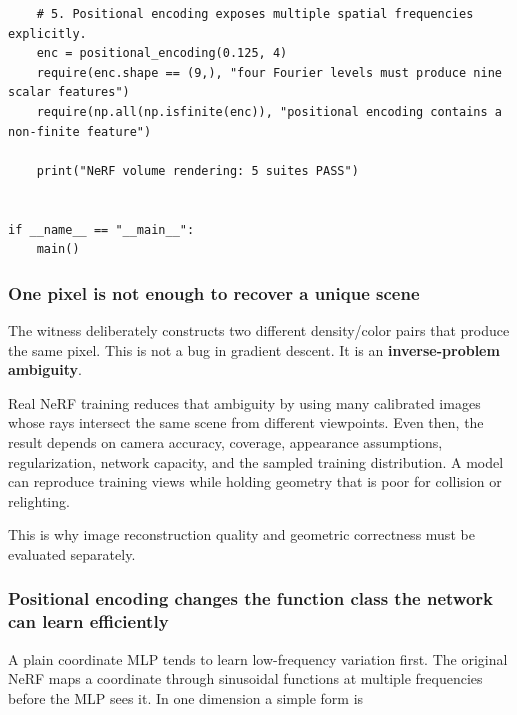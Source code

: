 \begin{verbatim}
    # 5. Positional encoding exposes multiple spatial frequencies explicitly.
    enc = positional_encoding(0.125, 4)
    require(enc.shape == (9,), "four Fourier levels must produce nine scalar features")
    require(np.all(np.isfinite(enc)), "positional encoding contains a non-finite feature")

    print("NeRF volume rendering: 5 suites PASS")


if __name__ == "__main__":
    main()
\end{verbatim}

\subsubsection{One pixel is not enough to recover a unique scene}\label{04-visual-computing-ii-ch035-one-pixel-is-not-enough-to-recover-a-unique-scene}

\hypertarget{04-visual-computing-ii-ch035-one-pixel-is-not-enough-to-recover-a-unique-scene}{}

The witness deliberately constructs two different density/color pairs that produce the same pixel. This is not a bug in gradient descent. It is an \textbf{inverse-problem ambiguity}.

Real NeRF training reduces that ambiguity by using many calibrated images whose rays intersect the same scene from different viewpoints. Even then, the result depends on camera accuracy, coverage, appearance assumptions, regularization, network capacity, and the sampled training distribution. A model can reproduce training views while holding geometry that is poor for collision or relighting.

This is why image reconstruction quality and geometric correctness must be evaluated separately.

\subsubsection{Positional encoding changes the function class the network can learn efficiently}\label{04-visual-computing-ii-ch035-positional-encoding-changes-the-function-class-the-network-can-learn-efficiently}

\hypertarget{04-visual-computing-ii-ch035-positional-encoding-changes-the-function-class-the-network-can-learn-efficiently}{}

A plain coordinate MLP tends to learn low-frequency variation first. The original NeRF maps a coordinate through sinusoidal functions at multiple frequencies before the MLP sees it. In one dimension a simple form is

